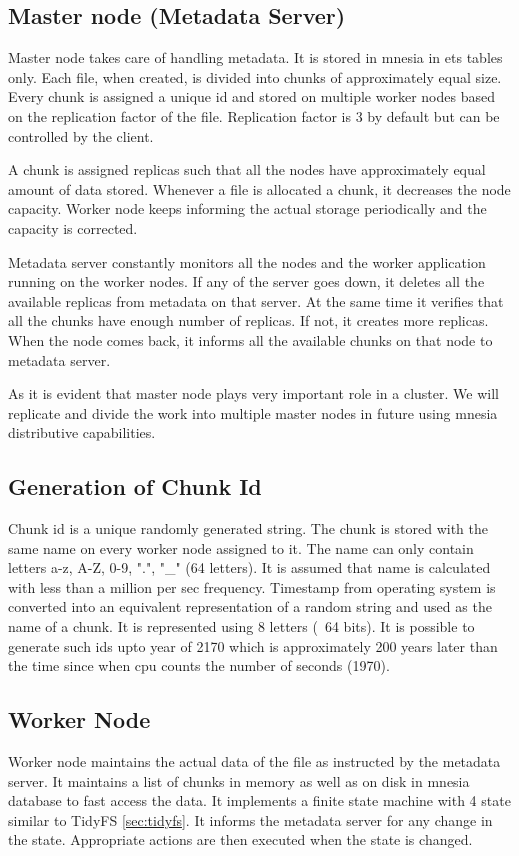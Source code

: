 \documentclass[a4paper,12pt]{article}
\begin{document}
\subsection{Master node (Metadata Server)}
Master node takes care of handling metadata. It is stored in mnesia in ets tables only. Each file, when created, is divided into chunks of approximately equal size. Every chunk is assigned a unique id and stored on multiple worker nodes based on the replication factor of the file. Replication factor is 3 by default but can be controlled by the client.

A chunk is assigned replicas such that all the nodes have approximately equal amount of data stored. Whenever a file is allocated a chunk, it decreases the node capacity. Worker node keeps informing the actual storage periodically and the capacity is corrected.

Metadata server constantly monitors all the nodes and the worker application running on the worker nodes. If any of the server goes down, it deletes all the available replicas from metadata on that server. At the same time it verifies that all the chunks have enough number of replicas. If not, it creates more replicas. When the node comes back, it informs all the available chunks on that node to metadata server.

As it is evident that master node plays very important role in a cluster. We will replicate and divide the work into multiple master nodes in future using mnesia distributive capabilities.

\subsection{Generation of Chunk Id}
Chunk id is a unique randomly generated string. The chunk is stored with the same name on every worker node assigned to it. The name can only contain letters a-z, A-Z, 0-9, ".", "\_" (64 letters). It is assumed that name is calculated with less than a million per sec frequency.  Timestamp from operating system is converted into an equivalent representation of a random string and used as the name of a chunk. It is represented using 8 letters (~64 bits). It is possible to generate such ids upto year of 2170 which is approximately 200 years later than the time since when cpu counts the number of seconds (1970).

\subsection{Worker Node}
Worker node maintains the actual data of the file as instructed by the metadata server. It maintains a list of chunks in memory as well as on disk in mnesia database to fast access the data. It implements a finite state machine with 4 state similar to TidyFS \ref{sec:tidyfs}. It informs the metadata server for any change in the state. Appropriate actions are then executed when the state is changed.
\end{document}
